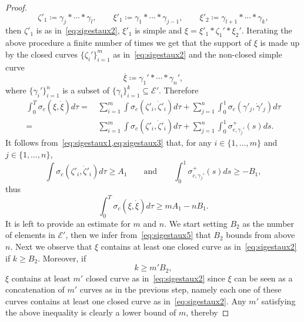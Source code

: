 \documentclass[11pt,a4paper,american]{article}
\newcommand{\Ecal}{\mathcal E}
\begin{document}
\begin{proof}
        \begin{equation*}
            \zeta'_1\coloneqq\gamma_j*\dotsb*\gamma_l,\qquad\xi'_1\coloneqq\gamma_1*\dotsb*\gamma_{j-1},\qquad\xi'_2\coloneqq\gamma_{l+1}*\dotsb*\gamma_k,
        \end{equation*}
        then $\zeta'_1$ is as in~\cref{eq:sigestaux2}, $\xi'_1$ is simple and $\xi=\xi'_1*\zeta_1'*\xi_2'$. Iterating the above procedure a finite number of times we get that the support of $\xi$ is made up by the closed curves $\{\zeta_i'\}_{i=1}^m$ as in~\cref{eq:sigestaux2} and the non-closed simple curve
        \begin{equation}\label{eq:sigestaux5}
            \overline\xi\coloneqq\gamma_1'*\dotsb*\gamma_n',
        \end{equation}
        where $\{\gamma_i'\}_{i=1}^n$ is a subset of $\{\gamma_i\}_{i=1}^k\subseteq\Ecal'$. Therefore
        \begin{align*}
            \int_0^T\sigma_c\left(\xi,\dot\xi\right)d\tau=\,&\sum_{i=1}^m\int\sigma_c\left(\zeta'_i,\dot\zeta'_i\right)d\tau+\sum_{j=1}^n\int_0^1\sigma_c\left(\gamma'_j,\dot\gamma'_j\right)d\tau\\
            =\,&\sum_{i=1}^m\int\sigma_c\left(\zeta'_i,\dot\zeta'_i\right)d\tau+\sum_{j=1}^n\int_0^1\sigma_{c,\gamma_j'}^+(s)ds.
        \end{align*}
        It follows from~\cref{eq:sigestaux1,eq:sigestaux3} that, for any $i\in\{1,\dotsc,m\}$ and $j\in\{1,\dotsc,n\}$,
        \begin{equation*}
            \int\sigma_c\left(\zeta'_i,\dot\zeta'_i\right)d\tau\ge A_1\qquad\text{and}\qquad\int_0^1\sigma_{c,\gamma_j'}^+(s)ds\ge-B_1,
        \end{equation*}
        thus
        \begin{equation}\label{eq:sigestaux6}
            \int_0^T\sigma_c\left(\xi,\dot\xi\right)d\tau\ge mA_1-nB_1.
        \end{equation}
        It is left to provide an estimate for $m$ and $n$. We start setting $B_2$ as the number of elements in $\Ecal'$, then we infer from~\cref{eq:sigestaux5} that $B_2$ bounds from above $n$. Next we observe that $\xi$ contains at least one closed curve as in~\cref{eq:sigestaux2} if $k\ge B_2$. Moreover, if
        \begin{equation*}
            k\ge m'B_2,
        \end{equation*}
        $\xi$ contains at least $m'$ closed curve as in~\cref{eq:sigestaux2} since $\xi$ can be seen as a concatenation of $m'$ curves as in the previous step, namely each one of these curves contains at least one closed curve as in~\cref{eq:sigestaux2}. Any $m'$ satisfying the above inequality is clearly a lower bound of $m$, thereby

\end{proof}
\end{document}
